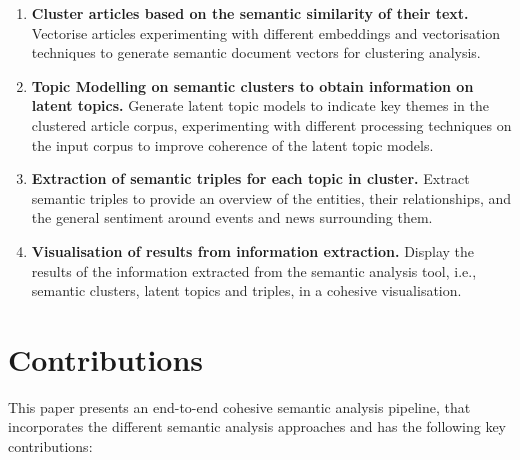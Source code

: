 \begin{enumerate}
    \item \textbf{Cluster articles based on the semantic similarity of their text.} Vectorise articles experimenting with different embeddings and vectorisation techniques to generate semantic document vectors for clustering analysis.

    \item \textbf{Topic Modelling on semantic clusters to obtain information on latent topics.} Generate latent topic models to indicate key themes in the clustered article corpus, experimenting with different processing techniques on the input corpus to improve coherence of the latent topic models.

    \item \textbf{Extraction of semantic triples for each topic in cluster.} Extract semantic triples to provide an overview of the entities, their relationships, and the general sentiment around events and news surrounding them.

    \item \textbf{Visualisation of results from information extraction.} Display the results of the information extracted from the semantic analysis tool, i.e., semantic clusters, latent topics and triples, in a cohesive visualisation.

\end{enumerate}

\section{Contributions} \label{contributions}

This paper presents an end-to-end cohesive semantic analysis pipeline, that incorporates the different semantic analysis approaches and has the following key contributions:

